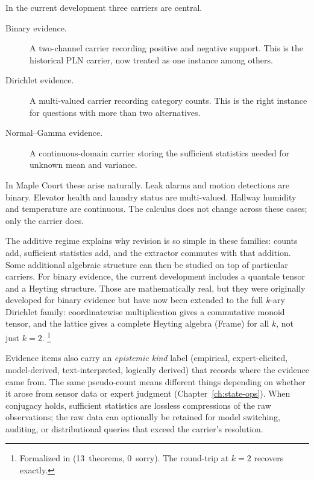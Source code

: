 \documentclass[11pt,openany]{report}
\begin{document}
In the current development three carriers are central.

\begin{description}
\item[Binary evidence.]  A two-channel carrier recording positive and negative
  support.  This is the historical PLN carrier, now treated as one instance
  among others.
\item[Dirichlet evidence.]  A multi-valued carrier recording category counts.
  This is the right instance for questions with more than two alternatives.
\item[Normal--Gamma evidence.]  A continuous-domain carrier storing the
  sufficient statistics needed for unknown mean and variance.
\end{description}

In Maple Court these arise naturally.  Leak alarms and motion detections are
binary.  Elevator health and laundry status are multi-valued.  Hallway
humidity and temperature are continuous.  The calculus does not change across
these cases; only the carrier does.

The additive regime explains why revision is so simple in these families:
counts add, sufficient statistics add, and the extractor commutes with that
addition.  Some additional algebraic structure can then be studied on top of
particular carriers.  For binary evidence, the current development includes a
quantale tensor and a Heyting structure.  Those are mathematically real, but
they were originally developed for binary evidence but have now
been extended to the full $k$-ary Dirichlet family:
coordinatewise multiplication gives a commutative monoid tensor,
and the lattice gives a complete Heyting algebra (Frame) for all
$k$, not just $k = 2$.%
\footnote{Formalized in
(13~theorems, 0~sorry).  The round-trip at $k=2$ recovers
 exactly.}

Evidence items also carry an \emph{epistemic kind} label
(empirical, expert-elicited, model-derived, text-interpreted,
logically derived) that records where the evidence came from.
The same pseudo-count means different things depending on whether
it arose from sensor data or expert judgment
(Chapter~\ref{ch:state-ops}).  When conjugacy holds, sufficient
statistics are lossless compressions of the raw observations; the
raw data can optionally be retained for model switching, auditing,
or distributional queries that exceed the carrier's resolution.
\end{document}

